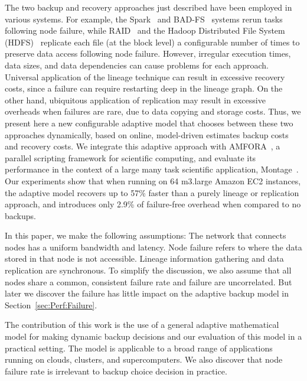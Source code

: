 \documentclass{sig-alternate}
\newcommand{\zhaonote}[1]{{\textcolor{cyan}    { ***Zhao:      #1 }}}
\newcommand{\zhaonote}[1]{}
\begin{document}
The two backup and recovery approaches just described have been employed in various systems. For example,
the Spark~\cite{RDD2012} and BAD-FS~\cite{badfs2004} systems rerun tasks following node failure,
while RAID~\cite{raid1988} and the Hadoop Distributed File System (HDFS)~\cite{HDFS} replicate each file (at the block level) a configurable number of times to preserve data access following node failure.
However, irregular execution times, data sizes, and data dependencies can cause problems for each approach. Universal application of the lineage technique can result in excessive recovery costs, since a failure can 
require restarting deep in the lineage graph.
On the other hand, ubiquitous application of replication may result in excessive overheads when failures are rare, due to data copying and storage costs.
Thus, we present here a new configurable adaptive model that chooses between these two approaches dynamically,
based on online, model-driven estimates backup costs and recovery costs. We integrate this adaptive approach with
AMFORA~\cite{AMFS2013},
a parallel scripting framework for scientific computing, and evaluate its performance in the context of a large many task scientific application, Montage~\cite{montage1}. 
Our experiments show that when running on 64 m3.large Amazon EC2 instances, the adaptive model recovers up to 57\% faster than a purely lineage or replication approach, and introduces only 2.9\% of failure-free overhead when compared to no backups.



In this paper, we make the following assumptions: The network that connects nodes has a uniform bandwidth and latency. Node failure refers to where the data stored in that node is not accessible. Lineage information gathering and data replication are synchronous. To simplify the discussion, we also assume that all nodes share a common, consistent failure rate and failure are uncorrelated. But later we discover the failure has little impact on the adaptive backup model in Section~\ref{sec:Perf:Failure}. 


The contribution of this work is the use of a general adaptive mathematical model for making dynamic backup decisions and our evaluation of this model in a practical setting.
The model is applicable to a broad range of applications running on clouds, clusters, and supercomputers. We also discover that node failure rate is irrelevant to backup choice decision in practice.
\end{document}
